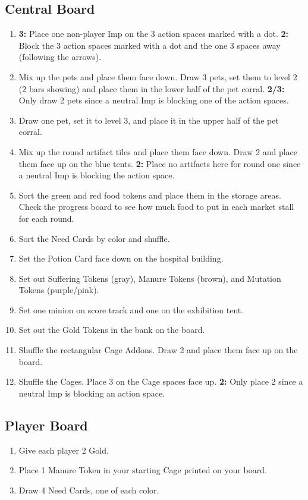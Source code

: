 \documentclass[12pt]{article}
\newenvironment{enumerateCustom}
{\begin{enumerate}
  \setlength{\itemsep}{1pt}
  \setlength{\parskip}{0pt}
  \setlength{\parsep}{0pt}}
{\end{enumerate}}
\begin{document}
\begin{multicols*}{2}
\subsection*{Central Board}
\begin{enumerateCustom}
	\item \textbf{3:} Place one non-player Imp on the 3 action spaces marked with a dot. \textbf{2:} Block the 3 action spaces marked with a dot and the one 3 spaces away (following the arrows).
	\item Mix up the pets and place them face down. Draw 3 pets, set them to level 2 (2 bars showing) and place them in the lower half of the pet corral. \textbf{2/3:} Only draw 2 pets since a neutral Imp is blocking one of the action spaces.
	\item Draw one pet, set it to level 3, and place it in the upper half of the pet corral.
	\item Mix up the round artifact tiles and place them face down. Draw 2 and place them face up on the blue tents. \textbf{2:} Place no artifacts here for round one since a neutral Imp is blocking the action space.
	\item Sort the green and red food tokens and place them in the storage areas. Check the progress board to see how much food to put in each market stall for each round.
	\item Sort the Need Cards by color and shuffle.
	\item Set the Potion Card face down on the hospital building.
	\item Set out Suffering Tokens (gray), Manure Tokens (brown), and Mutation Tokens (purple/pink).
	\item Set one minion on score track and one on the exhibition tent.
	\item Set out the Gold Tokens in the bank on the board.
	\item Shuffle the rectangular Cage Addons. Draw 2 and place them face up on the board.
	\item Shuffle the Cages. Place 3 on the Cage spaces face up. \textbf{2:} Only place 2 since a neutral Imp is blocking an action space.
\end{enumerateCustom}

\subsection*{Player Board}
\begin{enumerateCustom}
	\item Give each player 2 Gold.
	\item Place 1 Manure Token in your starting Cage printed on your board.
	\item Draw 4 Need Cards, one of each color.
\end{enumerateCustom}


\end{multicols*}
\end{document}
